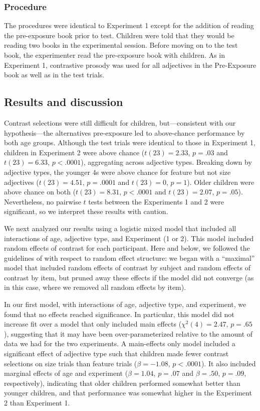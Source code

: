 \documentclass[man]{apa2}
\begin{document}
\subsubsection{Procedure}

The procedures were identical to Experiment 1 except for the addition of reading the pre-exposure book prior to test. Children were told that they would be reading two books in the experimental session. Before moving on to the test book, the experimenter read the pre-exposure book with children. As in Experiment 1, contrastive prosody was used for all adjectives in the Pre-Exposure book as well as in the test trials.

\subsection{Results and discussion}

Contrast selections were still difficult for children, but---consistent with our hypothesis---the alternatives pre-exposure led to above-chance performance by both age groups. Although the test trials were identical to those in Experiment 1, children in Experiment 2 were above chance ($t(23) = 2.33$, $p = .03$ and $t(23) = 6.33$, $p < .0001$), aggregating across adjective types. Breaking down by adjective types, the younger 4s were above chance for feature but not size adjectives ($t(23) = 4.51$, $p = .0001$ and $t(23)=0$, $p = 1$). Older children were above chance on both ($t(23) = 8.31$, $p < .0001$ and $t(23)= 2.07$, $p = .05$). Nevertheless, no pairwise $t$ tests between the Experiments 1 and 2 were significant, so we interpret these results with caution. 

We next analyzed our results using a logistic mixed model that included all interactions of age, adjective type, and Experiment (1 or 2). This model included random effects of contrast for each participant. Here and below, we followed the guidelines of  with respect to random effect structure: we began with a ``maximal'' model that included random effects of contrast by subject and random effects of contrast by item, but pruned away these effects if the model did not converge (as in this case, where we removed all random effects by item). 

In our first model, with interactions of age, adjective type, and experiment, we found that no effects reached significance. In particular, this model did not increase fit over a model that only included main effects ($\chi^2(4) = 2.47$, $p = .65$), suggesting that it may have been over-parameterized relative to the amount of data we had for the two experiments. A main-effects only model included a significant effect of adjective type such that children made fewer contrast selections on size trials than feature trials ($\beta = -1.08$, $p < .0001$). It also included marginal effects of age and experiment ($\beta = 1.04$, $p = .07$ and $\beta = .50$, $p = .09$, respectively), indicating that older children performed somewhat better than younger children, and that performance was somewhat higher in the Experiment 2 than Experiment 1. 
\end{document}
